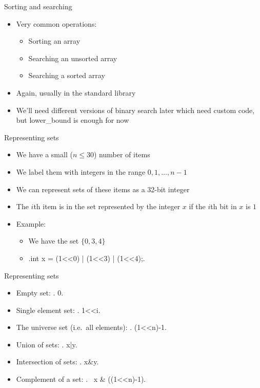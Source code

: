 \documentclass[12pt,t]{beamer}
\newcommand{\bi}{\begin{itemize}}
\newcommand{\ei}{\end{itemize}}
\begin{document}
\begin{frame}{Sorting and searching}
    \vspace{30pt}

    \bi
        \item Very common operations:
            \bi
                \item Sorting an array 
                \item Searching an unsorted array 
                \item Searching a sorted array 
            \ei

        \item Again, usually in the standard library
        \item We'll need different versions of binary search later which need custom code, but lower\_{}bound is enough for now
    \ei
\end{frame}

\begin{frame}[fragile]{Representing sets}
    \vspace{30pt}
    \bi
        \item We have a small ($n\leq 30$) number of items
        \item We label them with integers in the range $0,1,\ldots,n-1$
        \item We can represent sets of these items as a 32-bit integer
        \item The $i$th item is in the set represented by the integer $x$ if the $i$th bit in $x$ is $1$
        \item Example:
            \bi
                \item We have the set $\{0,3,4\}$
                \item {}.int x = (1<<0) | (1<<3) | (1<<4);.
            \ei
    \ei
\end{frame}

\begin{frame}[fragile]{Representing sets}
    \vspace{5pt}
    \bi
        \item Empty set:
            .   0.
        \item Single element set:
            .   1<<i.
        \item The universe set (i.e.\ all elements):
            .   (1<<n)-1.
        \item Union of sets:
            .   x|y.
        \item Intersection of sets: .   x&y.
        \item Complement of a set: .   ~x & ((1<<n)-1).
    \ei
\end{frame}
\end{document}
